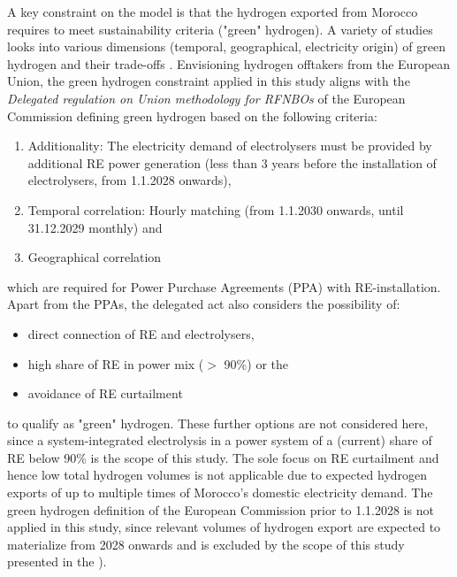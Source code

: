A key constraint on the model is that the hydrogen exported from Morocco requires to meet sustainability criteria ("green" hydrogen). A variety of studies looks into various dimensions (temporal, geographical, electricity origin) of green hydrogen and their trade-offs \cite{Brauer2022, Ruhnau2022, Zeyen2024}.
Envisioning hydrogen offtakers from the European Union, the green hydrogen constraint applied in this study aligns with the \emph{Delegated regulation on Union methodology for RFNBOs} of the European Commission \cite{Commission2023} defining green hydrogen  based on the following criteria:

\begin{enumerate}
    \item Additionality: The electricity demand of electrolysers must be provided by additional RE power generation (less than 3 years before the installation of electrolysers, from 1.1.2028 onwards),
    \item Temporal correlation: Hourly matching (from 1.1.2030 onwards, until 31.12.2029 monthly) and
    \item Geographical correlation
\end{enumerate}
which are required for Power Purchase Agreements (PPA) with RE-installation. Apart from the PPAs, the delegated act also considers the possibility of:
\begin{itemize}
    \item direct connection of RE and electrolysers,
    \item high share of RE in power mix ($>$ 90\%) or the
    \item avoidance of RE curtailment
\end{itemize}
to qualify as "green" hydrogen. These further options are not considered here, since a system-integrated electrolysis in a power system of a (current) share of RE below 90\% is the scope of this study. The sole focus on RE curtailment and hence low total hydrogen volumes is not applicable due to expected hydrogen exports of up to multiple times of Morocco's domestic electricity demand. The green hydrogen definition of the European Commission prior to 1.1.2028 is not applied in this study, since relevant volumes of hydrogen export are expected to materialize from 2028 onwards and is excluded by the scope of this study presented in the ).



